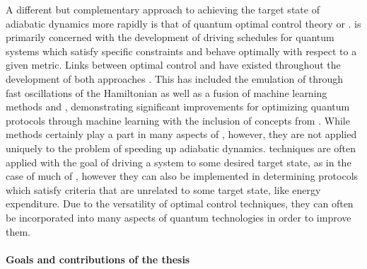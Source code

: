 A different but complementary approach to achieving the target state of adiabatic dynamics more rapidly is that of quantum optimal control theory or  \cite{glaser_training_2015, koch_quantum_2022}.  is primarily concerned with the development of driving schedules for quantum systems which satisfy specific constraints and behave optimally with respect to a given metric. Links between optimal control and  have existed throughout the development of both approaches \cite{stefanatos_frictionless_2010, stefanatos_shortcut_2021, zhang_connection_2021}. This has included the emulation of  through fast oscillations of the Hamiltonian \cite{petiziol_accelerated_2020, petiziol_fast_2018} as well as a fusion of machine learning methods and , demonstrating significant improvements for
optimizing quantum protocols through machine learning with the inclusion of concepts from  \cite{bukov_reinforcement_2018, yao_reinforcement_2021, khait_optimal_2022}. While  methods certainly play a part in many aspects of , however, they are not applied uniquely to the problem of speeding up adiabatic dynamics.  techniques are often applied with the goal of driving a system to some desired target state, as in the case of much of , however they can also be implemented in determining protocols which satisfy criteria that are unrelated to some target state, like energy expenditure. Due to the versatility of optimal control techniques, they can often be incorporated into many aspects of quantum technologies in order to improve them.


\paragraph*{Goals and contributions of the thesis}

